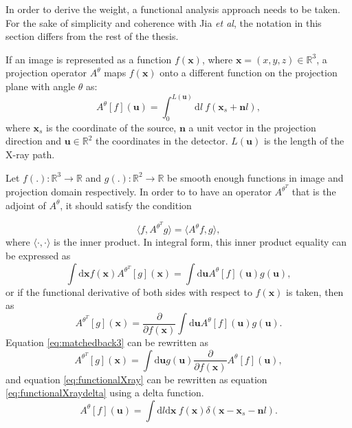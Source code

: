 In order to derive the weight, a functional analysis approach needs to be taken. For the sake of simplicity and coherence with Jia \textit{et al}, the notation in this section differs from the rest of the thesis. 

If an image is represented as a function $f(\textbf{x})$, where $\textbf{x}=(x,y,z)\in \mathbb{R}^3$, a projection operator $A^\theta$ maps $f(\textbf{x})$ onto a different function on the projection plane with angle $\theta$ as:
\begin{equation}
A^\theta[f](\textbf{u})=\int_0^{L(\textbf{u})}\mathrm{d}l \ f(\textbf{x}_s+\textbf{n}l),
\label{eq:functionalXray}
\end{equation}
where $\textbf{x}_s$ is the coordinate of the source, $\textbf{n}$ a unit vector in the projection direction and $\textbf{u}\in \mathbb{R}^2 $ the coordinates in the detector. $L(\textbf{u})$ is the length of the X-ray path. 

Let $f(.):\mathbb{R}^3 \rightarrow \mathbb{R}$ and $g(.):\mathbb{R}^2 \rightarrow \mathbb{R}$ be smooth enough functions in image and  projection domain respectively. In order to to have an operator $A^{\theta^T}$ that is the adjoint of $A^\theta$, it should satisfy the condition 

\begin{equation}
\langle f, A^{\theta^T} g\rangle = \langle A^\theta f,g \rangle,
\end{equation}
where $\langle \cdot, \cdot\rangle $ is the inner product. In integral form, this inner product equality can be expressed as
\begin{equation}
\int \mathrm{d}\textbf{x}f(\textbf{x})A^{\theta^T} [g](\textbf{x})=\int \mathrm{d}\textbf{u}A^{\theta} [f](\textbf{u}) g(\textbf{u}),
\end{equation}
or if the functional derivative of both sides with respect to $f(\textbf{x})$ is taken, then as
\begin{equation}
A^{\theta^T} [g](\textbf{x})=\frac{\partial}{\partial f(\textbf{x})}\int \mathrm{d}\textbf{u}A^{\theta} [f](\textbf{u}) g(\textbf{u}).
\label{eq:matchedback3}
\end{equation}
Equation \ref{eq:matchedback3} can be rewritten as
\begin{equation}
A^{\theta^T} [g](\textbf{x})=\int \mathrm{d}\textbf{u}g(\textbf{u})\frac{\partial}{\partial f(\textbf{x})}A^{\theta} [f](\textbf{u}),
\label{eq:matchedback4}
\end{equation}
and equation \ref{eq:functionalXray} can be rewritten as equation \ref{eq:functionalXraydelta} using a delta function.
\begin{equation}
A^\theta[f](\textbf{u})=\int\mathrm{d}l\mathrm{d}\textbf{x} \ f(\textbf{x})\delta(\textbf{x}-\textbf{x}_s-\textbf{n}l).
\label{eq:functionalXraydelta}
\end{equation}

